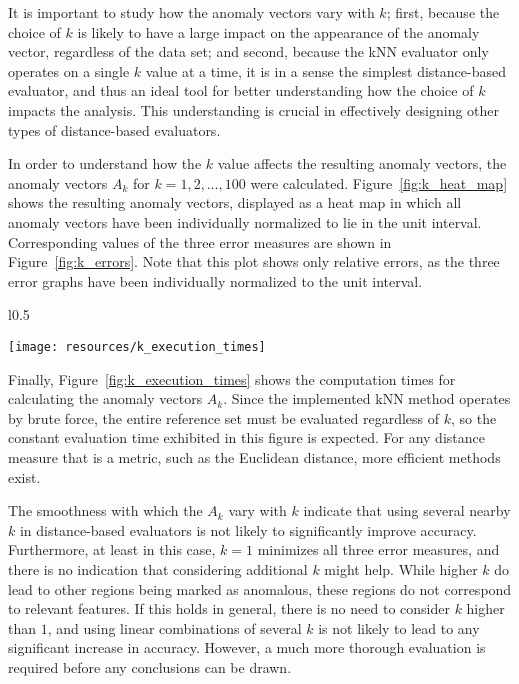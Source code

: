 It is important to study how the anomaly vectors vary with $k$; first, because the choice of $k$ is likely to have a large impact on the appearance of the anomaly vector, regardless of the data set; and second, because the kNN evaluator only operates on a single $k$ value at a time, it is in a sense the simplest distance-based evaluator, and thus an ideal tool for better understanding how the choice of $k$ impacts the analysis. This understanding is crucial in effectively designing other types of distance-based evaluators. 

In order to understand how the $k$ value affects the resulting anomaly vectors, the anomaly vectors $A_{k}$ for $k = 1,2,\dots,100$ were calculated. Figure~\ref{fig:k_heat_map} shows the resulting anomaly vectors, displayed as a heat map in which all anomaly vectors have been individually normalized to lie in the unit interval. Corresponding values of the three error measures are shown in Figure~\ref{fig:k_errors}. Note that this plot shows only relative errors, as the three error graphs have been individually normalized to the unit interval.

\begin{wrapfigure}{l}{0.5\textwidth}
    \vspace{-20pt}
    \begin{center}
        \texttt{[image: resources/k\_execution\_times]}
    \end{center}
    \vspace{-20pt}
    \caption{\small{Evaluation times when varying $k$ on the standard sequence.}}
    \vspace{-20pt}
\label{fig:k_execution_times}
\end{wrapfigure}

Finally, Figure~\ref{fig:k_execution_times} shows the computation times for calculating the anomaly vectors $A_k$. Since the implemented kNN method operates by brute force, the entire reference set must be evaluated regardless of $k$, so the constant evaluation time exhibited in this figure is expected. For any distance measure that is a metric, such as the Euclidean distance, more efficient methods exist.

The smoothness with which the $A_k$ vary with $k$ indicate that using several nearby $k$ in distance-based evaluators is not likely to significantly improve accuracy. Furthermore, at least in this case, $k=1$ minimizes all three error measures, and there is no indication that considering additional $k$ might help. While higher $k$ do lead to other regions being marked as anomalous, these regions do not correspond to relevant features. If this holds in general, there is no need to consider $k$ higher than $1$, and using linear combinations of several $k$ is not likely to lead to any significant increase in accuracy. However, a much more thorough evaluation is required before any conclusions can be drawn.

